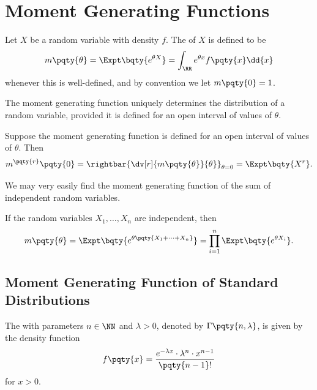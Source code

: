 \section{Moment Generating Functions}

\begin{definition}
    \label{def:moment-generating-fn}%
    Let \(X\) be a random variable with density \(f\). The  of \(X\) is defined to be
    \[
        m\pqty{\theta} = \Expt\bqty{e^{\theta X}} = \int_{\RR} e^{\theta x} f\pqty{x} \dd{x}
    \]
    whenever this is well-defined, and by convention we let \(m\pqty{0} = 1\).
\end{definition}

\begin{theorem}
    \label{thm:uniqueness-mgf}%
    The moment generating function uniquely determines the distribution of a random variable, provided it is defined for an open interval of values of \(\theta\).
\end{theorem}

\begin{theorem}
    \label{thm:derivative-mgf-moment}%
    Suppose the moment generating function is defined for an open interval of values of \(\theta\). Then
    \[
        m^{\pqty{r}} \pqty{0} = \rightbar{\dv[r]{m\pqty{\theta}}{\theta}}_{\theta = 0} = \Expt\bqty{X^r}.
    \]
\end{theorem}

We may very easily find the moment generating function of the sum of independent random variables.

\begin{claim}
    \label{claim:mgf-sum-independent}%
    If the random variables \(X_1, \ldots, X_n\) are independent, then
    \[
        m\pqty{\theta} = \Expt\bqty{e^{\theta \pqty{X_1 + \cdots + X_n}}} = \prod_{i = 1}^{n} \Expt\bqty{e^{\theta X_i}}.
    \]
\end{claim}

\subsection{Moment Generating Function of Standard Distributions}

\begin{definition}
    \label{def:gamma-distribution}%
    The  with parameters \(n \in \NN\) and \(\lambda > 0\), denoted by \(\Gamma\pqty{n, \lambda}\), is given by the density function
    \[
        f\pqty{x} = \frac{e^{-\lambda x} \cdot \lambda^n \cdot x^{n - 1}}{\pqty{n - 1}!}
    \]
    for \(x > 0\).
\end{definition}

